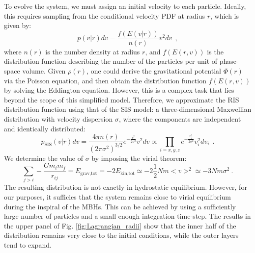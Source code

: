 \documentclass[fleqn,usenatbib]{mnras}
\begin{document}
To evolve the system, we must assign an initial velocity to each particle.
Ideally, this requires sampling from the conditional velocity PDF at radius $r$, which is given by:
\begin{equation}
    p(v|r)dv = \dfrac{f(E(v|r))}{n(r)} v^2 dv \:\: ,
    \label{eq:velocity_pdf}
\end{equation}
where $n(r)$ is the number density at radius $r$, and $f(E(r,v))$ is the distribution function describing the number of the particles per unit of phase-space volume.
Given $\rho(r)$, one could derive the gravitational potential $\Phi(r)$ via the Poisson equation, and then obtain the distribution function $f(E(r,v))$ by solving the Eddington equation.
However, this is a complex task that lies beyond the scope of this simplified model.
Therefore, we approximate the RIS distribution function using that of the SIS model: a three-dimensional Maxwellian distribution with velocity dispersion $\sigma$, where the components are independent and identically distributed:
\begin{equation}
    p_\text{SIS}(v|r)dv = \dfrac{4\pi n(r)}{\left(2\pi\sigma^2\right)^{3/2}} e^{-\frac{v^2}{2 \sigma^2}} v^2 dv \propto 
    \prod_{i=x,y,z} e^{-\frac{v_i^2}{2 \sigma^2}} v_i^2 dv_i \:\: .
    \label{eq:sis_distribution_function}
\end{equation}
We determine the value of $\sigma$ by imposing the virial theorem:
{\fontsize{7.7pt}{7.7pt}\begin{equation}
    \sum_{j > i} - \dfrac{G m_i m_j}{r_{ij}} = E_\text{grav,tot} = -2E_\text{kin,tot} \simeq -2\dfrac{1}{2} N m <v>^2 \simeq -3 N m \sigma^2 \:. 
\end{equation}}
The resulting distribution is not exactly in hydrostatic equilibrium.
However, for our purposes, it sufficies that the system remains close to virial equilibrium during the inspiral of the MBHs.
This can be achieved by using a sufficiently large number of particles and a small enough integration time-step.
The results in the upper panel of Fig. \ref{fig:Lagrangian_radii} show that the inner half of the distribution remains very close to the initial conditions, while the outer layers tend to expand.
\end{document}
